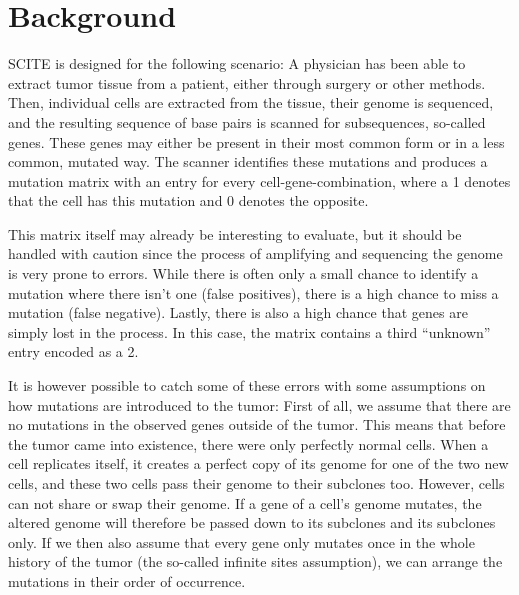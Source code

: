 \section{Background}

\ac{SCITE} is designed for the following scenario: A physician has been able to extract tumor tissue from a patient, either through surgery or other methods. Then, individual cells are extracted from the tissue, their genome is sequenced, and the resulting sequence of base pairs is scanned for subsequences, so-called genes. These genes may either be present in their most common form or in a less common, mutated way. The scanner identifies these mutations and produces a mutation matrix with an entry for every cell-gene-combination, where a 1 denotes that the cell has this mutation and 0 denotes the opposite.

This matrix itself may already be interesting to evaluate, but it should be handled with caution since the process of amplifying and sequencing the genome is very prone to errors. While there is often only a small chance to identify a mutation where there isn't one (false positives), there is a high chance to miss a mutation (false negative). Lastly, there is also a high chance that genes are simply lost in the process. In this case, the matrix contains a third ``unknown'' entry encoded as a 2.


It is however possible to catch some of these errors with some assumptions on how mutations are introduced to the tumor: First of all, we assume that there are no mutations in the observed genes outside of the tumor. This means that before the tumor came into existence, there were only perfectly normal cells. When a cell replicates itself, it creates a perfect copy of its genome for one of the two new cells, and these two cells pass their genome to their subclones too. However, cells can not share or swap their genome. If a gene of a cell's genome mutates, the altered genome will therefore be passed down to its subclones and its subclones only. If we then also assume that every gene only mutates once in the whole history of the tumor (the so-called infinite sites assumption), we can arrange the mutations in their order of occurrence.

